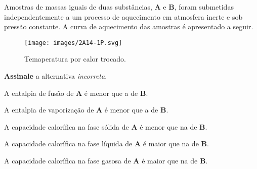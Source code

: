 \documentclass[braun, twocolumn]{braun}
\begin{document}
\begin{problem}
[2A14]Amostras de massas iguais de duas substâncias, \textbf{A} e \textbf{B},
foram submetidas independentemente a um processo de aquecimento em
atmosfera inerte e sob pressão constante. A curva de aquecimento das
amostras é apresentado a seguir.

\begin{figure}
\centering
\texttt{[image: images/2A14-1P.svg]}
\caption{Temaperatura por calor trocado.}
\end{figure}

\textbf{Assinale} a alternativa \emph{incorreta}.


\begin{choices}

\item A entalpia de fusão de \textbf{A} é menor que a de \textbf{B}.

\item A entalpia de vaporização de \textbf{A} é menor que a de \textbf{B}.

\item A capacidade calorífica na fase sólida de \textbf{A} é menor que na de
\textbf{B}.

\item A capacidade calorífica na fase líquida de \textbf{A} é maior que na de
\textbf{B}.

\item A capacidade calorífica na fase gasosa de \textbf{A} é maior que na de
\textbf{B}.

\end{choices}

\end{problem}
\end{document}
